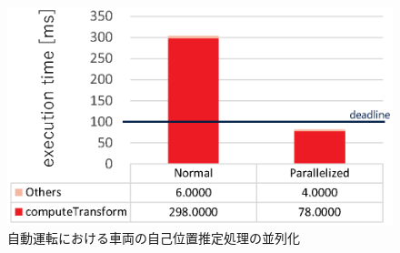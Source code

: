\documentclass[a4j,10pt,twocolumn]{abstract}
\begin{document}
\begin{figure}[t]
    \centering
    \includegraphics[width=0.9\linewidth]{../../figure/BarGraph_ndt_matching.eps}
    \caption{\label{fig:eval}
    自動運転における車両の自己位置推定処理の並列化}
\end{figure}



  

\newpage
\pagebreak
\end{document}
